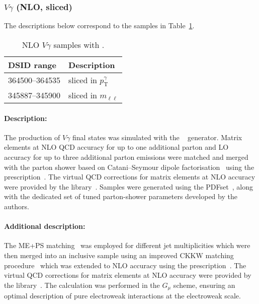 


\subsubsection[Vgamma (NLO, sliced)]{$V\gamma$ (NLO, sliced)}

The descriptions below correspond to the samples in
Table~\ref{tab:MB-sherpa-vynlo}.

\begin{table}[htbp]
  \caption{NLO $V\gamma$ samples with \SHERPA.}%
  \label{tab:MB-sherpa-vynlo}
  \centering
  \begin{tabular}{l l}
    \toprule
    DSID range & Description \\
    \midrule
    364500--364535   & sliced in $p_{\text{T}}^{\gamma}$\\ 
    345887--345900   & sliced in $m_{\ell\ell}$\\
    \bottomrule
  \end{tabular}
\end{table}

\paragraph{Description:}

The production of $V\gamma$ final states was simulated with the
\SHERPA[2.2.2]~\cite{Bothmann:2019yzt} generator.  Matrix elements at
NLO QCD accuracy for up to one additional parton and LO accuracy for
up to three additional parton emissions were matched and merged with
the \SHERPA parton shower based on Catani--Seymour
dipole factorisation~\cite{Gleisberg:2008fv,Schumann:2007mg} using the \MEPSatNLO
prescription~\cite{Hoeche:2011fd,Hoeche:2012yf,Catani:2001cc,Hoeche:2009rj}.
The virtual QCD corrections for matrix elements at NLO accuracy were
provided by the
\OPENLOOPS library~\cite{Buccioni:2019sur,Cascioli:2011va,Denner:2016kdg}. Samples
were generated using the \NNPDF[3.0nnlo] PDFset~\cite{Ball:2014uwa}, along with
the dedicated set of tuned parton-shower parameters developed by the
\SHERPA authors.


\paragraph{Additional description:}

The ME+PS matching~\cite{Hoeche:2011fd} was employed for different jet
multiplicities which were then merged into an inclusive sample 
using an improved CKKW matching
procedure~\cite{Catani:2001cc,Hoeche:2009rj} which was extended to NLO
accuracy using the \MEPSatNLO prescription~\cite{Hoeche:2012yf}. 
The virtual QCD corrections for matrix elements at NLO accuracy were
provided by the \OPENLOOPS library~\cite{Buccioni:2019sur,Cascioli:2011va,Denner:2016kdg}. 
The calculation was performed in the $G_\mu$ scheme, ensuring an optimal 
description of pure electroweak interactions at the electroweak scale.

